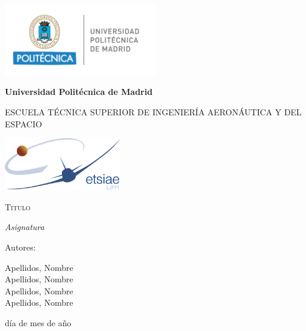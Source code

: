\documentclass[                         %
12pt,                                   %
a4paper,                                %
oneside                                 %
]{book}		                            %
\begin{document}
\begin{titlepage}
\centering
{\includegraphics[width=0.5\textwidth]{Logos/UPM}\par}
\vspace{0.1cm}
{\bfseries\LARGE Universidad Politécnica de Madrid \par}
\vspace{0.5cm}
{\scshape\large ESCUELA TÉCNICA SUPERIOR DE INGENIERÍA AERONÁUTICA Y DEL ESPACIO \par}
\vspace{0.25cm}
{\includegraphics[width=0.38\textwidth]{Logos/ETSIAE} \par}
\vspace{1cm}
{\scshape\Large Titulo \par}
\vspace{0.7cm}
{\itshape\large Asignatura \par}
\vfill
{\Large Autores: \par}
{\large Apellidos, Nombre \\ Apellidos, Nombre \\ Apellidos, Nombre \\ Apellidos, Nombre \par}
\vfill
{\Large día de mes de año \par}
\end{titlepage}

\frontmatter							%
{\hypersetup{linkcolor=black}	    	%
	\tableofcontents
	\cleardoublepage
	\listoffigures
	\cleardoublepage
	\listoftables
}

\mainmatter






\backmatter
\end{document}
